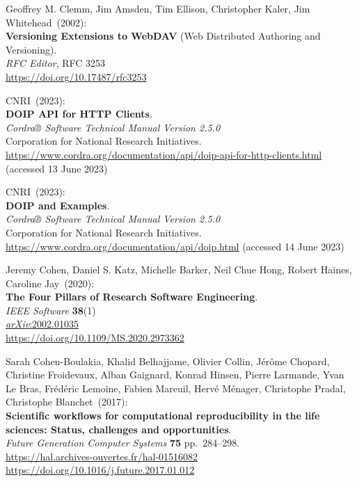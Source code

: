 \begin{thebibliography}{9}
Geoffrey M. Clemm, Jim Amsden, Tim Ellison, Christopher Kaler, Jim Whitehead~(2002): \\
\textbf{Versioning Extensions to WebDAV} (Web Distributed Authoring and Versioning).\\
\emph{RFC Editor}, RFC 3253 \\
\url{https://doi.org/10.17487/rfc3253}

CNRI~(2023): \\
\textbf{DOIP API for HTTP Clients}.\\
\emph{Cordra® Software Technical Manual Version 2.5.0}\\
Corporation for National Research Initiatives.\\
\url{https://www.cordra.org/documentation/api/doip-api-for-http-clients.html}
(accessed 13 June 2023)

CNRI~(2023): \\
\textbf{DOIP and Examples}.\\
\emph{Cordra® Software Technical Manual Version 2.5.0}\\
Corporation for National Research Initiatives.\\
\url{https://www.cordra.org/documentation/api/doip.html}
(accessed 14 June 2023)

Jeremy Cohen, Daniel S. Katz, Michelle Barker, Neil Chue Hong, Robert Haines, Caroline Jay~(2020):\\
\textbf{The Four Pillars of Research Software Engineering}.\\
\emph{IEEE Software} \textbf{38}(1)\\
\href{https://doi.org/10.48550/arXiv.2002.01035}{\emph{arXiv}:2002.01035}\\
\url{https://doi.org/10.1109/MS.2020.2973362}

Sarah Cohen-Boulakia, Khalid Belhajjame, Olivier Collin, Jérôme Chopard, Christine Froidevaux, Alban Gaignard, Konrad Hinsen, Pierre Larmande, Yvan Le Bras, Frédéric Lemoine, Fabien Mareuil, Hervé Ménager, Christophe Pradal, Christophe Blanchet~(2017): \\
\textbf{Scientific workflows for computational reproducibility in the life sciences: Status, challenges and opportunities}.\\
\emph{Future Generation Computer Systems} \textbf{75} pp.~284--298.\\
\url{https://hal.archives-ouvertes.fr/hal-01516082}\\
\url{https://doi.org/10.1016/j.future.2017.01.012}


\end{thebibliography}
